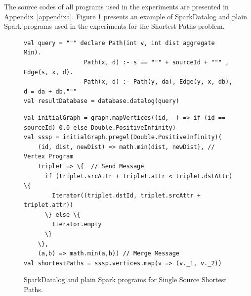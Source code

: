 The source codes of all programs used in the experiments are presented in Appendix~\ref{appendixa}. Figure \ref{sourcecodesample} presents an example of SparkDatalog and plain Spark programs used in the experiments for the Shortest Paths problem.

\begin{figure}
\begin{Verbatim}[label=Shortest paths - SparkDatalog]
val query = """ declare Path(int v, int dist aggregate Min).
                 Path(x, d) :- s == """ + sourceId + """ , Edge(s, x, d).
                 Path(x, d) :- Path(y, da), Edge(y, x, db), d = da + db."""
val resultDatabase = database.datalog(query)
\end{Verbatim}

\vspace{0cm}

\begin{Verbatim}[label=Shortest paths - Spark]
val initialGraph = graph.mapVertices((id, _) => if (id == sourceId) 0.0 else Double.PositiveInfinity)
val sssp = initialGraph.pregel(Double.PositiveInfinity)(
    (id, dist, newDist) => math.min(dist, newDist), // Vertex Program
    triplet => \{  // Send Message
      if (triplet.srcAttr + triplet.attr < triplet.dstAttr) \{
        Iterator((triplet.dstId, triplet.srcAttr + triplet.attr))
      \} else \{
        Iterator.empty
      \}
    \},
    (a,b) => math.min(a,b)) // Merge Message
val shortestPaths = sssp.vertices.map(v => (v._1, v._2))
\end{Verbatim}
\caption{SparkDatalog and plain Spark programs for Single Source Shortest Paths.\label{sourcecodesample}}
\end{figure}


